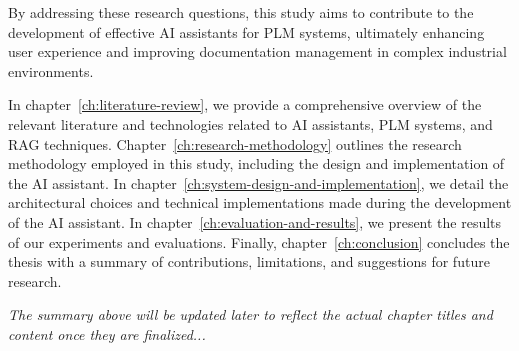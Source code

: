 By addressing these research questions, this study aims to contribute to the development of effective AI assistants for PLM systems, ultimately enhancing user experience and improving documentation management in complex industrial environments.

In chapter~\ref{ch:literature-review}, we provide a comprehensive overview of the relevant literature and technologies related to AI assistants, PLM systems, and RAG techniques. Chapter~\ref{ch:research-methodology} outlines the research methodology employed in this study, including the design and implementation of the AI assistant. In chapter~\ref{ch:system-design-and-implementation}, we detail the architectural choices and technical implementations made during the development of the AI assistant. In chapter~\ref{ch:evaluation-and-results}, we present the results of our experiments and evaluations. Finally, chapter~\ref{ch:conclusion} concludes the thesis with a summary of contributions, limitations, and suggestions for future research.


\textit{The summary above will be updated later to reflect the actual chapter titles and content once they are finalized...}
